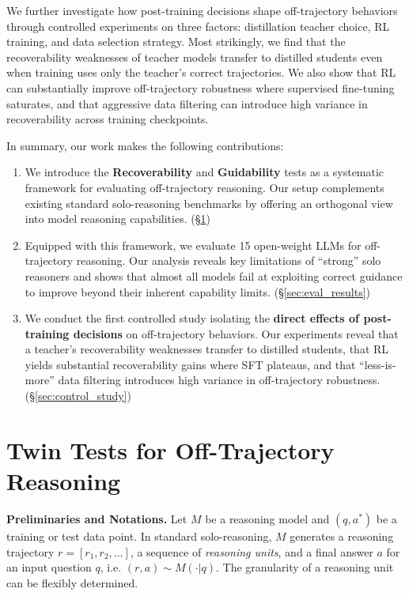 \documentclass{article} %
\begin{document}
We further investigate how post-training decisions shape off-trajectory behaviors through controlled experiments on three factors: distillation teacher choice, RL training, and data selection strategy. Most strikingly, we find that the recoverability weaknesses of teacher models transfer to distilled students even when training uses only the teacher's correct trajectories. We also show that RL can substantially improve off-trajectory robustness where supervised fine-tuning saturates, and that aggressive data filtering can introduce high variance in recoverability across training checkpoints.

In summary, our work makes the following contributions:
\begin{enumerate}
[leftmargin=*, itemsep=0pt, topsep=0pt]
    \item We introduce the \textbf{Recoverability} and \textbf{Guidability} tests as a systematic framework for evaluating off-trajectory reasoning. Our setup complements existing standard solo-reasoning benchmarks by offering an orthogonal view into model reasoning capabilities. (\S \ref{sec:twin_test_desc})
    \item Equipped with this framework, we evaluate 15 open-weight LLMs for off-trajectory reasoning. Our analysis reveals key limitations of ``strong'' solo reasoners and shows that almost all models fail at exploiting correct guidance to improve beyond their inherent capability limits.
    (\S \ref{sec:eval_results})
    \item We conduct the first controlled study isolating the \textbf{direct effects of post-training decisions} on off-trajectory behaviors. Our experiments reveal that a teacher's recoverability weaknesses transfer to distilled students, that RL yields substantial recoverability gains where SFT plateaus, and that ``less-is-more'' data filtering introduces high variance in off-trajectory robustness. (\S \ref{sec:control_study})
\end{enumerate}


\section{Twin Tests for Off-Trajectory Reasoning}
\label{sec:twin_test_desc}

\textbf{Preliminaries and Notations.} Let $M$ be a reasoning model and $(q, a^{*})$ be a training or test data point. In standard solo-reasoning, $M$ generates a reasoning trajectory $r = [r_1, r_2, \ldots]$, a sequence of \textit{reasoning units}, and a final answer $a$ for an input question $q$, i.e. $(r, a) \sim M(\cdot|q)$. The granularity of a reasoning unit can be flexibly determined.
\end{document}
